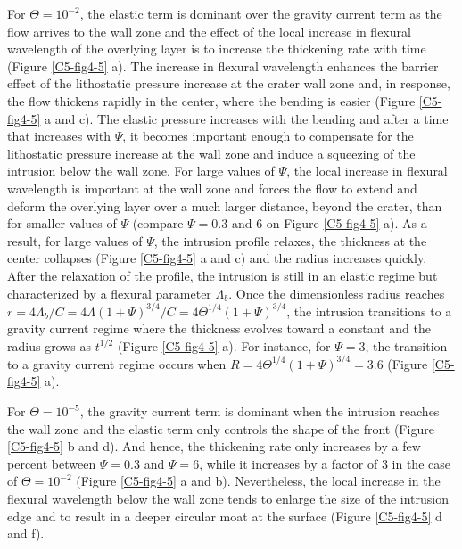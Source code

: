 For $\Theta=10^{-2}$,  the elastic term  is dominant over  the gravity
current term as  the flow arrives to  the wall zone and  the effect of
the local increase in flexural wavelength of the overlying layer is to
increase the thickening rate with time (Figure \ref{C5-fig4-5} a). The
increase in  flexural wavelength  enhances the  barrier effect  of the
lithostatic  pressure  increase  at  the  crater  wall  zone  and,  in
response, the flow  thickens rapidly in the center,  where the bending
is  easier (Figure  \ref{C5-fig4-5} a  and c).   The elastic  pressure
increases  with the  bending  and  after a  time  that increases  with
$\Psi$, it becomes important enough  to compensate for the lithostatic
pressure  increase at  the wall  zone and  induce a  squeezing of  the
intrusion below the  wall zone. For large values of  $\Psi$, the local
increase  in flexural  wavelength is  important at  the wall  zone and
forces the flow  to extend and deform the overlying  layer over a much
larger distance, beyond the crater,  than for smaller values of $\Psi$
(compare $\Psi=0.3$ and $6$ on Figure \ref{C5-fig4-5} a). As a result,
for  large  values  of  $\Psi$, the  intrusion  profile  relaxes,  the
thickness at the center collapses (Figure \ref{C5-fig4-5} a and c) and
the radius increases quickly. After the relaxation of the profile, the
intrusion  is  still in  an  elastic  regime  but characterized  by  a
flexural parameter $\Lambda_b$. Once  the dimensionless radius reaches
$r=4\Lambda_{b}/C=
4\Lambda(1+\Psi)^{3/4}/C=4\Theta^{1/4}(1+\Psi)^{3/4}$,
the  intrusion  transitions to  a  gravity  current regime  where  the
thickness evolves toward a constant  and the radius grows as $t^{1/2}$
(Figure  \ref{C5-fig4-5}   a).   For   instance,  for   $\Psi=3$,  the
transition    to    a    gravity   current    regime    occurs    when
$R= 4\Theta^{1/4}(1+\Psi)^{3/4}=3.6$ (Figure \ref{C5-fig4-5} a).
	 
For $\Theta=10^{-5}$,  the gravity current  term is dominant  when the
intrusion reaches the wall zone and the elastic term only controls the
shape of the  front (Figure \ref{C5-fig4-5} b and d).   And hence, the
thickening rate only increases by a few percent between $\Psi=0.3$ and
$\Psi=6$,  while it  increases  by a  factor  of $3$  in  the case  of
$\Theta=10^{-2}$ (Figure \ref{C5-fig4-5} a  and b).  Nevertheless, the
local increase in the flexural wavelength below the wall zone tends to
enlarge  the size  of the  intrusion edge  and to  result in  a deeper
circular moat at the surface (Figure \ref{C5-fig4-5} d and f).
		 
